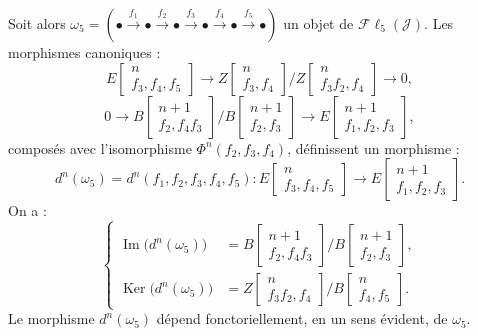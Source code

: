 Soit alors
$\omega_5=(\mathord\bullet\xrightarrow{f_1}\mathord\bullet
\xrightarrow{f_2}\mathord\bullet\xrightarrow{f_3}\mathord\bullet
\xrightarrow{f_4}\mathord\bullet\xrightarrow{f_5}\mathord\bullet)$
un objet de $\mathcal{F}\ell_5(\mathcal J)$. Les morphismes canoniques :
\[
E\!\begin{bmatrix}n\\ f_3,f_4,f_5\end{bmatrix}
\longrightarrow
Z\!\begin{bmatrix}n\\ f_3,f_4\end{bmatrix}
 \Big/
Z\!\begin{bmatrix}n\\ f_3f_2,f_4\end{bmatrix}
\longrightarrow0,
\]
\[
0\longrightarrow
B\!\begin{bmatrix}n+1\\ f_2,f_4f_3\end{bmatrix}
 \Big/
B\!\begin{bmatrix}n+1\\ f_2,f_3\end{bmatrix}
\longrightarrow
E\!\begin{bmatrix}n+1\\ f_1,f_2,f_3\end{bmatrix},
\]
composés avec l'isomorphisme $\Phi^n(f_2,f_3,f_4)$, définissent un
morphisme :
\[
d^n(\omega_5)=d^n(f_1,f_2,f_3,f_4,f_5)\colon
E\!\begin{bmatrix}n\\ f_3,f_4,f_5\end{bmatrix}
\longrightarrow
E\!\begin{bmatrix}n+1\\ f_1,f_2,f_3\end{bmatrix}.
\tag{4.2.3.2}
\]
On a :
\[
\left\{
\begin{aligned}
\operatorname{Im}\bigl(d^n(\omega_5)\bigr)
 &=B\!\begin{bmatrix}n+1\\ f_2,f_4f_3\end{bmatrix}
   \Big/
   B\!\begin{bmatrix}n+1\\ f_2,f_3\end{bmatrix},\\[2pt]
\operatorname{Ker}\bigl(d^n(\omega_5)\bigr)
 &=Z\!\begin{bmatrix}n\\ f_3f_2,f_4\end{bmatrix}
   \Big/
   B\!\begin{bmatrix}n\\ f_4,f_5\end{bmatrix}.
\end{aligned}
\right.
\tag{4.2.3.3}
\]
Le morphisme $d^n(\omega_5)$ dépend fonctoriellement, en un sens évident,
de $\omega_5$.

